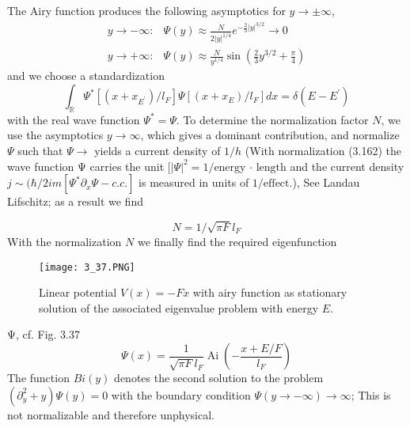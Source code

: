 The Airy function produces the following asymptotics for $y\to\pm\infty$,
\begin{equation}
\begin{array}{ll}{y \rightarrow-\infty:} & {\Psi(y) \approx \frac{N}{2|y|^{1 / 4}} e^{-\frac{2}{3}|y|^{3 / 2}} \rightarrow 0} \\ {y \rightarrow+\infty:} & {\Psi(y) \approx \frac{N}{y^{1 / 4}} \sin \left(\frac{2}{3} y^{3 / 2}+\frac{\pi}{4}\right)}\end{array}
\end{equation}
and we choose a standardization
\begin{equation}
    \int_{\mathbb{R}} \Psi^{*}\left[\left(x+x_{E^{\prime}}\right) / l_{F}\right] \Psi\left[\left(x+x_{E}\right) / l_{F}\right] d x=\delta\left(E-E^{\prime}\right)
    \end{equation}
with the real wave function $\Psi^*=\Psi$. To determine the normalization factor $N$, we use the asymptotics $y\to\infty$, which gives a dominant contribution, and normalize $\Psi$ such that $\Psi\to$ yields a current density of $1 / h$ (With normalization (3.162) the wave function Ψ carries the unit $[| \Psi |^2= 1 / \text{energy · length}$ and the current density $j\sim(\hbar/2im[\Psi^*\partial_x\Psi-c.c.]$ is measured in units of $1 / \text{effect}$.), See Landau Lifschitz; as a result we find

\begin{equation}
    N=1 / \sqrt{\pi F} l_{F}
    \end{equation}
With the normalization $N$ we finally find the required eigenfunction
\begin{figure}[ht]
    \begin{minipage}{0.5\textwidth}
        \centering
        \texttt{[image: 3\_37.PNG]}
    \end{minipage}
    \begin{minipage}{0.5\textwidth}
        \caption{Linear potential $V (x) = -F x$ with airy function as stationary solution of the associated eigenvalue problem with energy $E$.}
    \end{minipage}
\end{figure}
Ψ, cf. Fig. 3.37
\begin{equation}
    \Psi(x)=\frac{1}{\sqrt{\pi F} l_{F}} \operatorname{Ai}\left(-\frac{x+E / F}{l_{F}}\right)
    \end{equation}
The function $Bi (y)$ denotes the second solution to the problem $(\partial^2_y + y) \Psi (y) = 0$ with the boundary condition $\Psi(y\to -\infty)\to\infty$; This is not normalizable and therefore unphysical.
